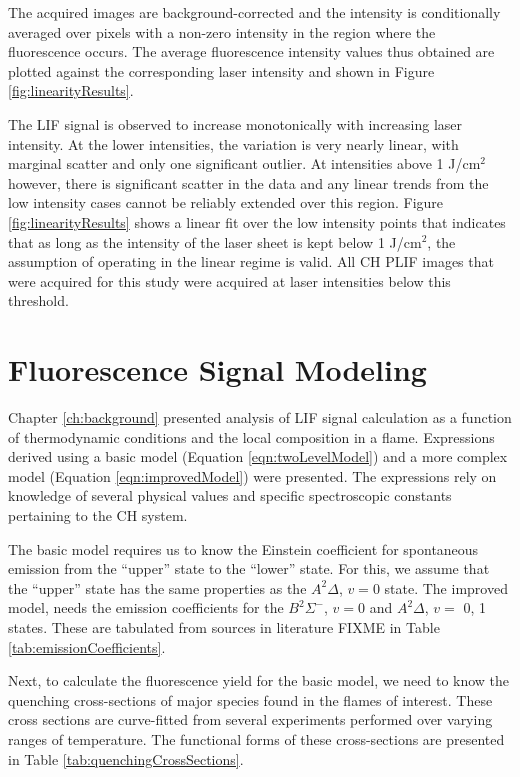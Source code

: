 The acquired images are background-corrected and the intensity is conditionally averaged over pixels with a non-zero intensity in the region where the fluorescence occurs.
The average fluorescence intensity values thus obtained are plotted against the corresponding laser intensity and shown in Figure \ref{fig:linearityResults}.

The LIF signal is observed to increase monotonically with increasing laser intensity.
At the lower intensities, the variation is very nearly linear, with marginal scatter and only one significant outlier.
At intensities above 1 J/cm\(^2\) however, there is significant scatter in the data and any linear trends from the low intensity cases cannot be reliably extended over this region.
Figure \ref{fig:linearityResults} shows a linear fit over the low intensity points that indicates that as long as the intensity of the laser sheet is kept below 1 J/cm\(^2\), the assumption of operating in the linear regime is valid.
All CH PLIF images that were acquired for this study were acquired at laser intensities below this threshold.

\section{Fluorescence Signal Modeling}
\label{sec:chplif-fluorescence-signal-modeling}

Chapter \ref{ch:background} presented analysis of LIF signal calculation as a function of thermodynamic conditions and the local composition in a flame.
Expressions derived using a basic model (Equation \ref{eqn:twoLevelModel}) and a more complex model (Equation \ref{eqn:improvedModel}) were presented.
The expressions rely on knowledge of several physical values and specific spectroscopic constants pertaining to the CH system.



The basic model requires us to know the Einstein coefficient for spontaneous emission from the ``upper'' state to the ``lower'' state.
For this, we assume that the ``upper'' state has the same properties as the \(A^2\Delta\), \(v = 0\) state.
The improved model, needs the emission coefficients for the \(B^2\Sigma^-\), \(v = 0\) and \(A^2\Delta\), \(v =\) 0, 1 states.
These are tabulated from sources in literature\cite{1985-garland-a,1996-luque-b} FIXME in Table \ref{tab:emissionCoefficients}.



Next, to calculate the fluorescence yield for the basic model, we need to know the quenching cross-sections of major species found in the flames of interest.
These cross sections are curve-fitted from several experiments performed over varying ranges of temperature.
The functional forms of these cross-sections are presented in Table \ref{tab:quenchingCrossSections}.

